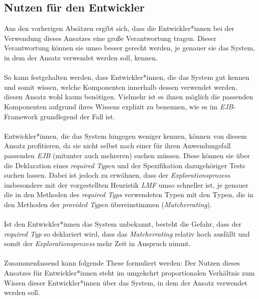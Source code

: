 \subsection{Nutzen für den Entwickler}
Aus den vorherigen Absätzen ergibt sich, dass die Entwickler*innen bei der Verwendung dieses Ansatzes eine große Verantwortung tragen. Dieser Verantwortung können sie umso besser gerecht werden, je genauer sie das System, in dem der Ansatz verwendet werden soll, kennen. 
\\\\
So kann festgehalten werden, dass Entwickler*innen, die das System gut kennen und somit wissen, welche Komponenten innerhalb dessen verwendet werden, diesen Ansatz wohl kaum benötigen. Vielmehr ist es ihnen möglich die passenden Komponenten aufgrund ihres Wissens explizit zu benennen, wie es im \emph{EJB}-Framework grundlegend der Fall ist.
\\\\
Entwickler*innen, die das System hingegen weniger kennen, können von diesem Ansatz profitieren, da sie nicht selbst nach einer für ihren Anwendungsfall passenden \emph{EJB} (mitunter auch mehreren) suchen müssen. Diese können sie über die Deklaration eines \emph{required Typen} und der Spezifikation dazugehöriger Tests suchen lassen. Dabei ist jedoch zu erwähnen, dass der \emph{Explorationsprozess} insbesondere mit der vorgestellten \Gls{Heuristik} \emph{LMF} umso schneller ist, je genauer die in den Methoden des \emph{required Typs} verwendeten Typen mit den Typen, die in den Methoden der \emph{provided Typen} übereinstimmen (\emph{Matcherrating}).
\\\\
Ist den Entwickler*innen das System unbekannt, besteht die Gefahr, dass der \emph{required Typ} so deklariert wird, dass das \emph{Matcherrating} relativ hoch ausfällt und somit der \emph{Explorationsprozess} mehr Zeit in Anspruch nimmt.
\\\\
Zusammenfassend kann folgende These formuliert werden: Der Nutzen dieses Ansatzes für Entwickler*innen steht im umgekehrt proportionalen Verhältnis zum Wissen dieser Entwickler*innen über das System, in dem der Ansatz verwendet werden soll. 
